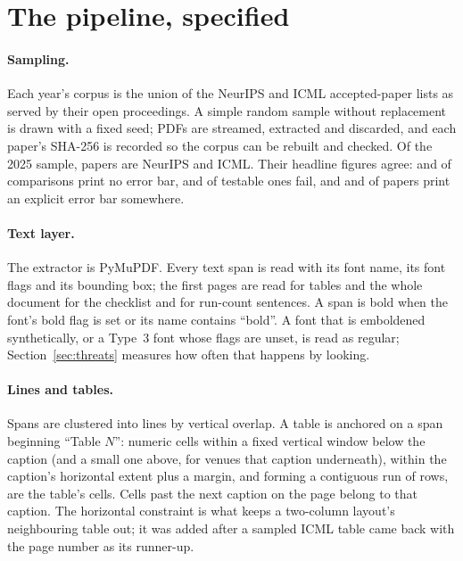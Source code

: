 \documentclass{article}
\begin{document}
\section{The pipeline, specified}
\label{app:pipeline}

\paragraph{Sampling.} Each year's corpus is the union of the NeurIPS and ICML
accepted-paper lists as served by their open proceedings. A simple random sample
without replacement is drawn with a fixed seed; PDFs are streamed, extracted and
discarded, and each paper's SHA-256 is recorded so the corpus can be rebuilt and
checked. Of the 2025 sample, \nNeuripsPapers{} papers are NeurIPS and
\nIcmlPapers{} ICML. Their headline figures agree: \nNeuripsNeither{} and
\nIcmlNeither{} of comparisons print no error bar, \nNeuripsFail{} and
\nIcmlFail{} of testable ones fail, and \nNeuripsErrorBar{} and
\nIcmlErrorBar{} of papers print an explicit error bar somewhere.

\paragraph{Text layer.} The extractor is PyMuPDF. Every text span is read with
its font name, its font flags and its bounding box; the first \nMaxPages{} pages
are read for tables and the whole document for the checklist and for run-count
sentences. A span is bold when the font's bold flag is set or its name contains
``bold''. A font that is emboldened synthetically, or a Type~3 font whose flags
are unset, is read as regular; Section~\ref{sec:threats} measures how often
that happens by looking.

\paragraph{Lines and tables.} Spans are clustered into lines by vertical
overlap. A table is anchored on a span beginning ``Table $N$'': numeric cells
within a fixed vertical window below the caption (and a small one above, for
venues that caption underneath), within the caption's horizontal extent plus a
margin, and forming a contiguous run of rows, are the table's cells. Cells past
the next caption on the page belong to that caption. The horizontal constraint
is what keeps a two-column layout's neighbouring table out; it was added after a
sampled ICML table came back with the page number as its runner-up.
\end{document}
